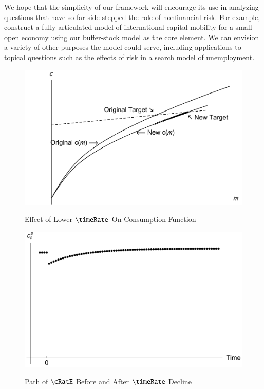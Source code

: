 \documentclass[titlepage,abstract]{\econtex}\newcommand{\texname}{ctDiscrete}
\begin{document}
We hope that the simplicity of our framework will encourage its use 
in analyzing questions that have so far
side-stepped the role of nonfinancial risk.
For example, \cite{cjSOE} construct a fully articulated model of
international capital mobility for a small open economy using our
buffer-stock model as the core element.  We can envision a variety of
other purposes the model could serve, including applications to
topical questions such as the effects of risk in a search model of
unemployment.


\clearpage%

\begin{figure}%
\caption{Effect of Lower $\timeRate$ On Consumption Function}%
\includegraphics{./Figures/PhaseDiagramDecreaseThetaPlot}%
\label{fig:DecreaseTheta}%
\end{figure}

\begin{figure}%
\caption{Path of $\cRatE$ Before and After $\timeRate$ Decline}%
\includegraphics{./Figures/cPathAfterThetaDrop}%
\label{fig:cPathAfterThetaDrop}%
\end{figure}
\end{document}
